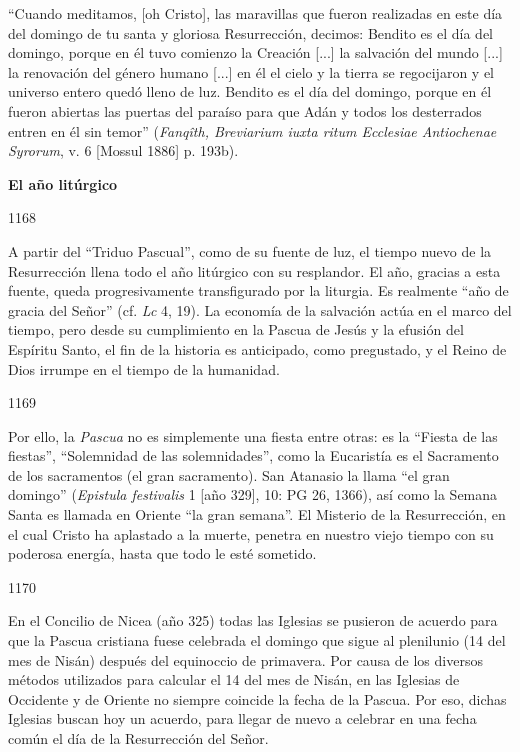 			\begin{ccecite}“Cuando meditamos, [oh Cristo], las maravillas que fueron realizadas en este día del domingo de tu santa y gloriosa Resurrección, decimos: Bendito es el día del domingo, porque en él tuvo comienzo la Creación [...] la salvación del mundo [...] la renovación del género humano [...] en él el cielo y la tierra se regocijaron y el universo entero quedó lleno de luz. Bendito es el día del domingo, porque en él fueron abiertas las puertas del paraíso para que Adán y todos los desterrados entren en él sin temor” (\textit{Fanqîth, Breviarium iuxta ritum Ecclesiae Antiochenae Syrorum}, v. 6 [Mossul 1886] p. 193b).\end{ccecite}
			
			\begin{ccebody}\textbf{El año litúrgico}\end{ccebody}
			
			\begin{ccebody}\begin{ccenumber}1168\end{ccenumber} A partir del “Triduo Pascual”, como de su fuente de luz, el tiempo nuevo de la Resurrección llena todo el año litúrgico con su resplandor. El año, gracias a esta fuente, queda progresivamente transfigurado por la liturgia. Es realmente “año de gracia del Señor” (cf. \textit{Lc} 4, 19). La economía de la salvación actúa en el marco del tiempo, pero desde su cumplimiento en la Pascua de Jesús y la efusión del Espíritu Santo, el fin de la historia es anticipado, como pregustado, y el Reino de Dios irrumpe en el tiempo de la humanidad.\end{ccebody}
			
			\begin{ccebody}\begin{ccenumber}1169\end{ccenumber} Por ello, la \textit{Pascua} no es simplemente una fiesta entre otras: es la “Fiesta de las fiestas”, “Solemnidad de las solemnidades”, como la Eucaristía es el Sacramento de los sacramentos (el gran sacramento). San Atanasio la llama “el gran domingo” (\textit{Epistula festivalis} 1 [año 329], 10: PG 26, 1366), así como la Semana Santa es llamada en Oriente “la gran semana”. El Misterio de la Resurrección, en el cual Cristo ha aplastado a la muerte, penetra en nuestro viejo tiempo con su poderosa energía, hasta que todo le esté sometido.\end{ccebody}
			
			\begin{ccebody}\begin{ccenumber}1170\end{ccenumber} En el Concilio de Nicea (año 325) todas las Iglesias se pusieron de acuerdo para que la Pascua cristiana fuese celebrada el domingo que sigue al plenilunio (14 del mes de Nisán) después del equinoccio de primavera. Por causa de los diversos métodos utilizados para calcular el 14 del mes de Nisán, en las Iglesias de Occidente y de Oriente no siempre coincide la fecha de la Pascua. Por eso, dichas Iglesias buscan hoy un acuerdo, para llegar de nuevo a celebrar en una fecha común el día de la Resurrección del Señor.\end{ccebody}
			

